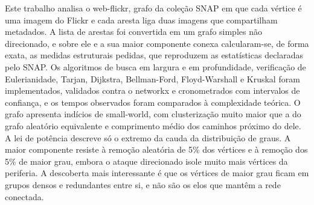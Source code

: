 Este trabalho analisa o web-flickr, grafo da coleção SNAP em que cada vértice é uma imagem do Flickr e cada aresta liga duas imagens que compartilham metadados. A lista de arestas foi convertida em um grafo simples não direcionado, e sobre ele e a sua maior componente conexa calcularam-se, de forma exata, as medidas estruturais pedidas, que reproduzem as estatísticas declaradas pelo SNAP. Os algoritmos de busca em largura e em profundidade, verificação de Eulerianidade, Tarjan, Dijkstra, Bellman-Ford, Floyd-Warshall e Kruskal foram implementados, validados contra o networkx e cronometrados com intervalos de confiança, e os tempos observados foram comparados à complexidade teórica. O grafo apresenta indícios de small-world, com clusterização muito maior que a do grafo aleatório equivalente e comprimento médio dos caminhos próximo do dele. A lei de potência descreve só o extremo da cauda da distribuição de graus. A maior componente resiste à remoção aleatória de 5\% dos vértices e à remoção dos 5\% de maior grau, embora o ataque direcionado isole muito mais vértices da periferia. A descoberta mais interessante é que os vértices de maior grau ficam em grupos densos e redundantes entre si, e não são os elos que mantêm a rede conectada.
